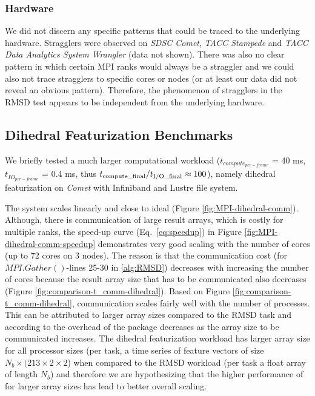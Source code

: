 \subsubsection*{Hardware}

We did not discern any specific patterns that could be traced to the underlying hardware. Stragglers were observed on \emph{SDSC Comet},
\emph{TACC Stampede} and \emph{TACC Data Analytics System Wrangler} (data not shown). There was also no clear pattern in which certain MPI
ranks would always be a straggler and we could also not trace stragglers to specific cores or nodes (or at least our data did not
reveal an obvious pattern). Therefore, the phenomenon of stragglers in the RMSD test appears to be independent from the underlying hardware.

\subsection{Dihedral Featurization Benchmarks}
\label{DF}
We briefly tested a much larger computational workload ($t_{compute_{per-frame}}$ = 40 ms, $t_{IO_{per-frame}}$ = 0.4 ms, thus ${t}_{\text{compute\_final}}/{t}_{\text{I/O\_final}} \approx 100$), namely dihedral
featurization on \emph{Comet} with Infiniband and Lustre file system.

The system scales linearly and close to ideal (Figure \ref{fig:MPI-dihedral-comm}). Although, there is communication of large
result arrays, which is costly for multiple ranks, the speed-up curve (Eq.~\ref{eq:speedup}) in Figure \ref{fig:MPI-dihedral-comm-speedup}
demonstrates very good scaling with the number of cores (up to 72 cores on 3 nodes).  The reason is that the communication cost (for
$MPI.Gather()$-lines 25-30 in \ref{alg:RMSD}) decreases with increasing the number of cores because the result array size that has to be
communicated also decreases (Figure \ref{fig:comparison-t_comm-dihedral}).  Based on Figure \ref{fig:comparison-t_comm-dihedral}, communication scales fairly well
with the number of processes. This can be attributed to larger array sizes compared to the RMSD task and according to \citet{Dalcin:2011aa}
the overhead of the  package decreases as the array size to be communicated increases. The dihedral featurization workload
has larger array size for all processor sizes (per task, a time series of feature vectors of size $N_{b} \times (213 \times 2 \times 2$) when
compared to the RMSD workload (per task a float array of length $N_{b}$) and therefore we are hypothesizing that the higher
performance of  for larger array sizes has lead to better overall scaling.
 
